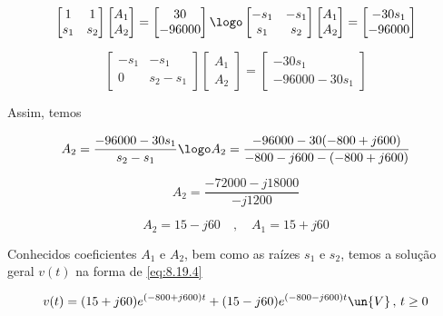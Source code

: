 \[
    \begin{bmatrix}
        1 & 1    \\
        s_1    & s_2
    \end{bmatrix}
    \begin{bmatrix}
        A_1 \\
        A_2
    \end{bmatrix}
    =
    \begin{bmatrix}
        30 \\
        -96000
    \end{bmatrix} \logo
    \begin{bmatrix}
        -s_1 & -s_1    \\
        s_1    & s_2
    \end{bmatrix}
    \begin{bmatrix}
        A_1 \\
        A_2
    \end{bmatrix}
    =
    \begin{bmatrix}
        -30s_1 \\
        -96000
    \end{bmatrix}
\]

\[
    \begin{bmatrix}
        -s_1 & -s_1    \\
        0    & s_2 - s_1
    \end{bmatrix}
    \begin{bmatrix}
        A_1 \\
        A_2
    \end{bmatrix}
    =
    \begin{bmatrix}
        -30s_1 \\
        -96000 - 30s_1
    \end{bmatrix}
\]

\endgroup

Assim, temos  

\[ A_2 = \frac{-96000 - 30s_1}{s_2 - s_1} \logo A_2 = \frac{-96000 - 30(-800 +j600)}{-800 -j600 - (-800 +j600)}\] 

\[ A_2 = \frac{-72000 - j18000}{-j1200} \] 

\[ A_2 = 15 - j60 \quad , \quad A_1 = 15 + j60 \] 

Conhecidos coeficientes $A_1$ e $A_2$, bem como as raízes $s_1$ e $s_2$, temos a solução geral $v(t)$ na forma de \eqref{eq:8.19.4}

\[ v(t) = (15 + j60)e^{(-800 + j600)t} + (15 - j60)e^{(-800 - j600)t} \un{V} \, , \, t \geq 0  \]

